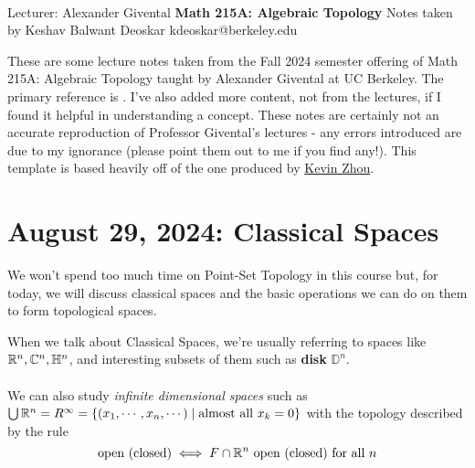 \documentclass[11pt]{article}
\begin{document}
\thispagestyle{empty}
\bigskip \
\vspace{0.1cm}

\begin{center}
{\fontsize{22}{22} \selectfont Lecturer: Alexander Givental}
\vskip 16pt
{\fontsize{30}{30} \selectfont \bf \sffamily Math 215A: Algebraic Topology}
\vskip 24pt
{\fontsize{14}{14} \selectfont \rmfamily Notes taken by Keshav Balwant Deoskar} 
\vskip 6pt
{\fontsize{14}{14} \selectfont \ttfamily kdeoskar@berkeley.edu} 
\vskip 24pt
\end{center}



These are some lecture notes taken from the Fall 2024 semester offering of Math 215A: Algebraic Topology taught by Alexander Givental at UC Berkeley. The primary reference is \cite{FomenkoFuchs16}. I've also added more content, not from the lectures, if I found it helpful in understanding a concept. These notes are certainly not an accurate reproduction of Professor Givental's lectures - any errors introduced are due to my ignorance (please point them out to me if you find any!). This template is based heavily off of the one produced by \href{https://knzhou.github.io/}{Kevin Zhou}.

\setcounter{tocdepth}{3}
\tableofcontents 

\newpage
\section{August 29, 2024: Classical Spaces}

We won't spend too much time on Point-Set Topology in this course but, for today, we will discuss classical spaces and the basic operations we can do on them to form topological spaces.

When we talk about Classical Spaces, we're usually referring to spaces like $\mathbb{R}^n, \mathbb{C}^n, \mathbb{H}^n$, and interesting subsets of them such as \textbf{disk} $\mathbb{D}^{n}$.
\\
\\
We can also study \textit{infinite dimensional spaces} such as $\bigcup \mathbb{R}^n = R^{\infty} = \{ (x_1, \cdots, x_n, \cdots)\; | \; \text{almost all $x_k = 0$} \}$ with the topology described by the rule
\[ \text{open (closed)} \iff F \cap \mathbb{R}^n \text{ open (closed) for all } n \] 
\end{document}
